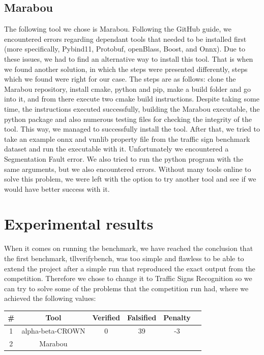 \documentclass[12pt,a4paper]{report}
\newcommand\tab[1][5mm]{\hspace*{#1}}
\begin{document}
\newpage
\section{Marabou}
The following tool we chose is Marabou. Following the GitHub guide, we encountered errors regarding dependant tools that needed to be installed first (more specifically, Pybind11, Protobuf, openBlass, Boost, and Onnx). Due to these issues, we had to find an alternative way to install this tool. That is when we found another solution, in which the steps were presented differently, steps which we found were right for our case. The steps are as follows: clone the Marabou repository, install cmake, python and pip, make a build folder and go into it, and from there execute two cmake build instructions. Despite taking some time, the instructions executed successfully, building the Marabou executable, the python package and also numerous testing files for checking the integrity of the tool. This way, we managed to successfully install the tool. After that, we tried to take an example onnx and vnnlib property file from the traffic sign benchmark dataset and run the executable with it. Unfortunately we encountered a Segmentation Fault error. We also tried to run the python program with the same arguments, but we also encountered errors. Without many tools online to solve this problem, we were left with the option to try another tool and see if we would have better success with it.


\chapter{Experimental results}
\tab When it comes on running the benchmark, we have reached the conclusion that the first benchmark, tllverifybench\cite{tll_verify_bench}, was too simple and flawless to be able to extend the project after a simple run that reproduced the exact output from the competition. Therefore we chose to change it to Traffic Signs Recognition\cite{traffic_signs_recognition} so we can try to solve some of the problems that the competition run had, where we achieved the following values:

\begin{center}
\begin{tabular}{ c c c c c c}
 \hline
 \textbf{\#} & \textbf{Tool} & \textbf{Verified} & \textbf{Falsified} & \textbf{Penalty}\\
 \hline
 1 & alpha-beta-CROWN & 0 & 39 & -3\\
 \hline
 2 & Marabou\\
 \hline
\end{tabular}
\end{center}
\vspace{10pt}
\end{document}
